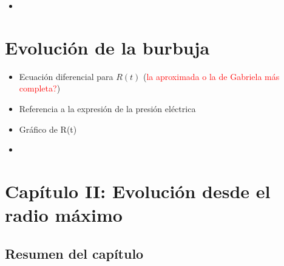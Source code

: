 \documentclass[aps,prb,twocolumn,superscriptaddress,floatfix,longbibliography,10pt]{revtex4-2}
\newcounter{para}
\begin{document}
\begin{itemize}
  \item 
\end{itemize}


\section{Evolución de la burbuja}

\begin{itemize}
  \item Ecuación diferencial para $R(t)$ (\textcolor{red}{la aproximada o la de Gabriela más completa?})
  \item Referencia a la expresión de la presión eléctrica
  \item Gráfico de R(t)
  \item 
\end{itemize}








\section*{Capítulo II: Evolución desde el radio máximo}

\subsection{Resumen del capítulo}
\end{document}
